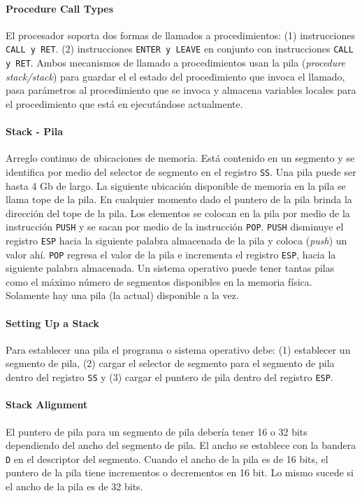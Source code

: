 \paragraph{\textnormal{\textbf{Procedure Call Types}}}
El procesador soporta dos formas de llamados a procedimientos: (1) instrucciones \texttt{CALL \textnormal{y} RET}. (2) instrucciones \texttt{ENTER \textnormal{y} LEAVE} en conjunto con instrucciones \texttt{CALL \textnormal{y} RET}. 
Ambos mecanismos de llamado a procedimientos usan la pila (\textit{procedure stack/stack}) para guardar el el estado del procedimiento que invoca el llamado, pasa parámetros al procedimiento que se invoca y almacena variables locales para el procedimiento que está en ejecutándose actualmente.

\paragraph{\textnormal{\textbf{Stack - Pila}}}
Arreglo continuo de ubicaciones de memoria. Está contenido en un segmento y se identifica por medio del selector de segmento en el registro \texttt{SS}. Una pila puede ser hasta 4 Gb de largo. La siguiente ubicación disponible de memoria en la pila se llama tope de la pila. En cualquier momento dado el puntero de la pila brinda la dirección del tope de la pila. Los elementos se colocan en la pila por medio de la instrucción \texttt{PUSH} y se sacan por medio de la instrucción \texttt{POP}. \texttt{PUSH} disminuye el registro \texttt{ESP} hacia la siguiente palabra almacenada de la pila y coloca (\textit{push}) un valor ahí. \texttt{POP} regresa el valor de la pila e incrementa el registro \texttt{ESP}, hacia la siguiente palabra almacenada. Un sistema operativo puede tener tantas pilas como el máximo número de segmentos disponibles en la memoria física. Solamente hay una pila (la actual) disponible a la vez.

\paragraph{Setting Up a Stack}
Para establecer una pila el programa o sistema operativo debe: (1) establecer un segmento de pila, (2) cargar el selector de segmento para el segmento de pila dentro del registro \texttt{SS} y (3) cargar el puntero de pila dentro del registro \texttt{ESP}.

\paragraph{Stack Alignment}
El puntero de pila para un segmento de pila debería tener 16 o 32 bits dependiendo del ancho del segmento de pila. El ancho se establece con la bandera \texttt{D} en el descriptor del segmento. Cuando el ancho de la pila es de 16 bits, el puntero de la pila tiene incrementos o decrementos en 16 bit. Lo mismo sucede si el ancho de la pila es de 32 bits.

